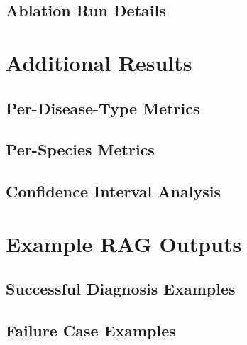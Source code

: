 \subsection{Ablation Run Details}
\label{subsec:appendix:runs:ablation}

%
%
\section{Additional Results}
\label{sec:appendix:results}

\subsection{Per-Disease-Type Metrics}
\label{subsec:appendix:results:disease}

\subsection{Per-Species Metrics}
\label{subsec:appendix:results:species}

\subsection{Confidence Interval Analysis}
\label{subsec:appendix:results:confidence}

%
%
\section{Example RAG Outputs}
\label{sec:appendix:outputs}

\subsection{Successful Diagnosis Examples}
\label{subsec:appendix:outputs:success}

\subsection{Failure Case Examples}
\label{subsec:appendix:outputs:failure}


